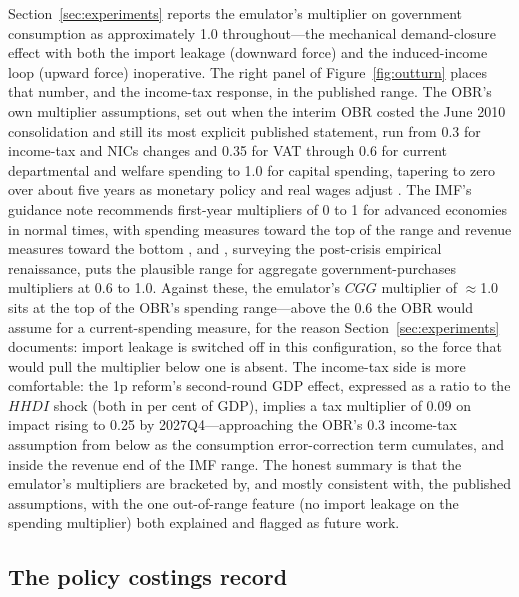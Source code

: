 Section~\ref{sec:experiments} reports the emulator's multiplier on government consumption as approximately 1.0 throughout---the mechanical demand-closure effect with both the import leakage (downward force) and the induced-income loop (upward force) inoperative. The right panel of Figure~\ref{fig:outturn} places that number, and the income-tax response, in the published range. The OBR's own multiplier assumptions, set out when the interim OBR costed the June 2010 consolidation and still its most explicit published statement, run from 0.3 for income-tax and NICs changes and 0.35 for VAT through 0.6 for current departmental and welfare spending to 1.0 for capital spending, tapering to zero over about five years as monetary policy and real wages adjust \citep{obr2010multipliers}. The IMF's guidance note recommends first-year multipliers of 0 to 1 for advanced economies in normal times, with spending measures toward the top of the range and revenue measures toward the bottom \citep{batini2014}, and \citet{ramey2019}, surveying the post-crisis empirical renaissance, puts the plausible range for aggregate government-purchases multipliers at 0.6 to 1.0. Against these, the emulator's $CGG$ multiplier of $\approx$1.0 sits at the top of the OBR's spending range---above the 0.6 the OBR would assume for a current-spending measure, for the reason Section~\ref{sec:experiments} documents: import leakage is switched off in this configuration, so the force that would pull the multiplier below one is absent. The income-tax side is more comfortable: the 1p reform's second-round GDP effect, expressed as a ratio to the $HHDI$ shock (both in per cent of GDP), implies a tax multiplier of 0.09 on impact rising to 0.25 by 2027Q4---approaching the OBR's 0.3 income-tax assumption from below as the consumption error-correction term cumulates, and inside the revenue end of the IMF range. The honest summary is that the emulator's multipliers are bracketed by, and mostly consistent with, the published assumptions, with the one out-of-range feature (no import leakage on the spending multiplier) both explained and flagged as future work.

\subsection{The policy costings record}
\label{sec:costingsdb}


